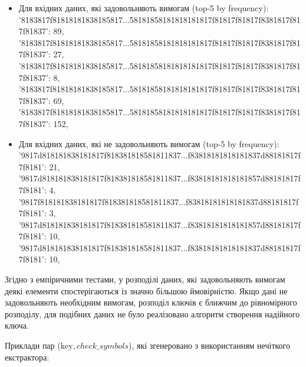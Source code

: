 \documentclass[11pt]{article}
\providecommand{\tightlist}{%
      \setlength{\itemsep}{0pt}\setlength{\parskip}{0pt}}
\begin{document}
\begin{itemize}
\tightlist
\item
  Для вхідних даних, які задовольняють вимогам (top-5 by frequency):\\
  '8183817f81818181838185817...58181858181818181817f81817f81817f8381817f817f81837': 89, \\
  '8183817f81818181838185817...58181858181818181817f81817f81817f8381817f817f81837': 27,\\
  '8183817f81818181838185817...58181858181818181817f81817f81817f8381817f817f81837': 8, \\
  '8183817f81818181838185817...58181858181818181817f81817f81817f8381817f817f81837': 69, \\
  '8183817f81818181838185817...58181858181818181817f81817f81817f8381817f817f81837': 152, \\
\item
  Для вхідних даних, які не задовольняють вимогам (top-5 by frequency):\\
  '9817d818181838181817f818381818581811837...f83818181818181837d88181817f7f8181': 21,\\  
  '9817d818181838181817f818381818581811837...f83818181818181857d88181817f7f8181': 4, \\
  '9817f818181838181817f818381818581811837...f83818181818181837d88181817f7f8181': 3, \\
  '9817d818181838181817f818381818581811837...f83818181818181857d88181817f7f8181': 10, \\
  '9817d818181838181817f818381818581811837...f83818181818181837d88181817f7f8181': 10, \\
  
\end{itemize}
\vspace{10ex}
Згідно з емпіричними тестами, у розподілі даних, які задовольняють
вимогам деякі елементи спостерігаються із значно більшою ймовірністю.
Якщо дані не задовольняють необхідним вимогам, розподіл ключів є ближчим
до рівномірного розподілу, для подібних даних не було реалізовано
алгоритм створення надійного ключа.

\vspace{7ex}

    Приклади пар (\(\text{key},check\_symbols\)), які згенеровано з
використанням нечіткого екстрактора:
\end{document}
